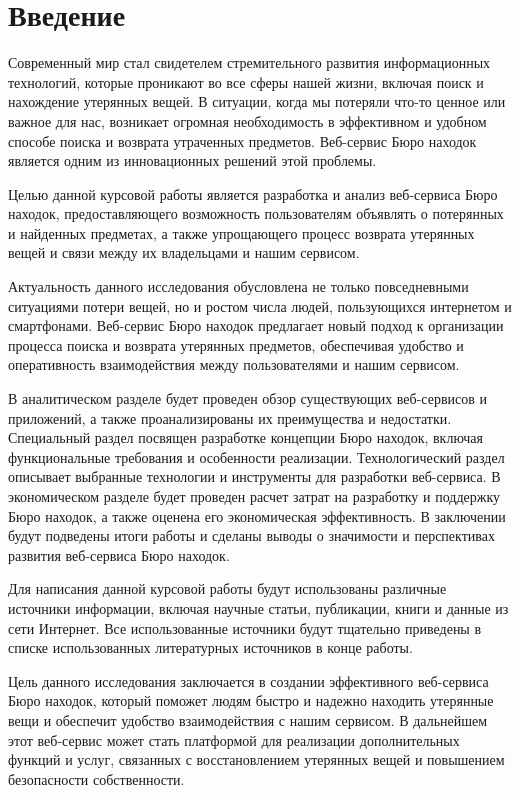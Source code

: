 \documentclass{mirea-prog-lang}
\begin{document}
	
\addtocounter{page}{2}

\tableofcontents


\section*{Введение}
{}

Современный мир стал свидетелем стремительного развития 
информационных технологий, которые проникают 
во все сферы нашей жизни, включая поиск и нахождение утерянных вещей. 
В ситуации, когда мы потеряли что-то ценное или важное для нас, 
возникает огромная необходимость в эффективном и 
удобном способе поиска и возврата утраченных предметов. 
Веб-сервис Бюро находок является одним из инновационных решений этой проблемы.

Целью данной курсовой работы является разработка 
и анализ веб-сервиса Бюро находок, предоставляющего 
возможность пользователям объявлять о потерянных 
и найденных предметах, а также упрощающего процесс возврата 
утерянных вещей и связи между их владельцами и нашим сервисом.

Актуальность данного исследования обусловлена не только повседневными 
ситуациями потери вещей, но и ростом числа людей, пользующихся интернетом 
и смартфонами. Веб-сервис Бюро находок предлагает новый подход 
к организации процесса поиска и возврата утерянных предметов, 
обеспечивая удобство и оперативность взаимодействия между пользователями 
и нашим сервисом.

В аналитическом разделе будет проведен обзор существующих веб-сервисов 
и приложений, а также проанализированы их преимущества и недостатки. 
Специальный раздел посвящен разработке концепции Бюро находок, 
включая функциональные требования и особенности реализации. 
Технологический раздел описывает выбранные технологии и инструменты 
для разработки веб-сервиса. В экономическом разделе будет проведен расчет 
затрат на разработку и поддержку Бюро находок, а также оценена 
его экономическая эффективность. В заключении будут подведены итоги работы 
и сделаны выводы о значимости и перспективах развития веб-сервиса Бюро находок.

Для написания данной курсовой работы будут использованы различные 
источники информации, включая научные статьи, публикации, книги и данные из сети Интернет. 
Все использованные источники будут тщательно приведены 
в списке использованных литературных источников в конце работы.

Цель данного исследования заключается в создании эффективного веб-сервиса Бюро находок, 
который поможет людям быстро и надежно находить утерянные вещи 
и обеспечит удобство взаимодействия с нашим сервисом. 
В дальнейшем этот веб-сервис может стать платформой 
для реализации дополнительных функций и услуг, связанных 
с восстановлением утерянных вещей и повышением безопасности собственности.
\end{document}
